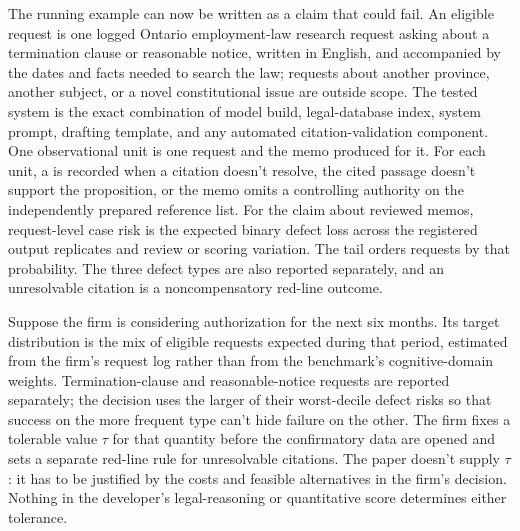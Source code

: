\documentclass[12pt]{article}
\begin{document}
The running example can now be written as a claim that could fail. An eligible request is one logged Ontario employment-law research request asking about a termination clause or reasonable notice, written in English, and accompanied by the dates and facts needed to search the law; requests about another province, another subject, or a novel constitutional issue are outside scope. The tested system is the exact combination of model build, legal-database index, system prompt, drafting template, and any automated citation-validation component. One observational unit is one request and the memo produced for it. For each unit, a  is recorded when a citation doesn't resolve, the cited passage doesn't support the proposition, or the memo omits a controlling authority on the independently prepared reference list. For the claim about reviewed memos, request-level case risk is the expected binary defect loss across the registered output replicates and review or scoring variation. The tail orders requests by that probability. The three defect types are also reported separately, and an unresolvable citation is a noncompensatory red-line outcome.

Suppose the firm is considering authorization for the next six months. Its target distribution is the mix of eligible requests expected during that period, estimated from the firm's request log rather than from the benchmark's cognitive-domain weights. Termination-clause and reasonable-notice requests are reported separately; the decision uses the larger of their worst-decile defect risks so that success on the more frequent type can't hide failure on the other. The firm fixes a tolerable value \(\tau\) for that quantity before the confirmatory data are opened and sets a separate red-line rule for unresolvable citations. The paper doesn't supply \(\tau\): it has to be justified by the costs and feasible alternatives in the firm's decision. Nothing in the developer's legal-reasoning or quantitative score determines either tolerance.
\end{document}
